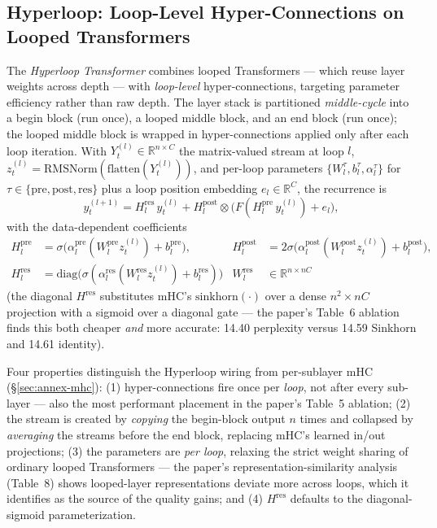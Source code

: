 \subsection{Hyperloop: Loop-Level Hyper-Connections on Looped Transformers}

\label{sec:annex-hyperloop}

The \emph{Hyperloop Transformer} \citep{zeitoun_hyperloop_2026} combines
looped Transformers --- which reuse layer weights across depth --- with
\emph{loop-level} hyper-connections, targeting parameter efficiency rather
than raw depth. The layer stack is partitioned \emph{middle-cycle} into a
begin block (run once), a looped middle block, and an end block (run once);
the looped middle block is wrapped in hyper-connections applied only after
each loop iteration. With $Y^{(l)}_t \in \mathbb{R}^{n \times C}$ the
matrix-valued stream at loop $l$, $z^{(l)}_t =
\mathrm{RMSNorm}(\mathrm{flatten}(Y^{(l)}_t))$, and per-loop parameters
$\{W^{\tau}_l, b^{\tau}_l, \alpha^{\tau}_l\}$ for $\tau \in
\{\text{pre}, \text{post}, \text{res}\}$ plus a loop position embedding
$e_l \in \mathbb{R}^C$, the recurrence is
\begin{equation}
y^{(l+1)}_t = H^{\text{res}}_l\, y^{(l)}_t + H^{\text{post}}_l \otimes
\bigl( F(H^{\text{pre}}_l\, y^{(l)}_t) + e_l \bigr),
\end{equation}
with the data-dependent coefficients
\begin{align*}
H^{\text{pre}}_l &= \sigma\bigl(\alpha^{\text{pre}}_l (W^{\text{pre}}_l z^{(l)}_t) + b^{\text{pre}}_l\bigr), &
H^{\text{post}}_l &= 2\sigma\bigl(\alpha^{\text{post}}_l (W^{\text{post}}_l z^{(l)}_t) + b^{\text{post}}_l\bigr),\\
H^{\text{res}}_l &= \mathrm{diag}\bigl(\sigma(\alpha^{\text{res}}_l (W^{\text{res}}_l z^{(l)}_t) + b^{\text{res}}_l)\bigr) &
W^{\text{res}}_l &\in \mathbb{R}^{n \times nC}
\end{align*}
(the diagonal $H^{\text{res}}$ substitutes mHC's $\mathrm{sinkhorn}(\cdot)$
over a dense $n^2 \times nC$ projection with a sigmoid over a diagonal gate ---
the paper's Table~6 ablation finds this both cheaper \emph{and} more
accurate: 14.40 perplexity versus 14.59 Sinkhorn and 14.61 identity).

Four properties distinguish the Hyperloop wiring from per-sublayer mHC
(\S\ref{sec:annex-mhc}): (1) hyper-connections fire once per
\emph{loop}, not after every sub-layer --- also the most performant placement
in the paper's Table~5 ablation; (2) the stream is created by \emph{copying}
the begin-block output $n$ times and collapsed by \emph{averaging} the
streams before the end block, replacing mHC's learned in/out projections;
(3) the parameters are \emph{per loop}, relaxing the strict weight sharing of
ordinary looped Transformers --- the paper's representation-similarity analysis
(Table~8) shows looped-layer representations deviate more across loops, which
it identifies as the source of the quality gains; and (4) $H^{\text{res}}$
defaults to the diagonal-sigmoid parameterization.

